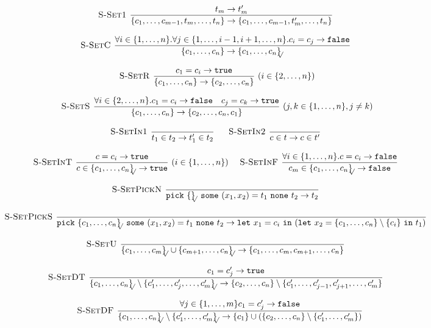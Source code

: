 \documentclass[a4paper]{article}
\newcommand{\s}[1]{\mathtt{#1}}
\newcommand{\sLb}{\s{\{}}
\newcommand{\sRb}{\s{\}}}
\newcommand{\spick}[3]{\s{pick}\ #1\ \s{some}\ #2\ \s{none}\ #3}
\newcommand{\sletin}[2]{\s{let\ } #1 \s{\ in\ } #2}
\newcommand{\strue}{\s{true}}
\newcommand{\sfalse}{\s{false}}
\newcommand{\sset}[1]{\sLb #1 \sRb}
\newcommand{\ssetc}[1]{\sset{#1}_{\!\!\!\surd}}
\newcommand{\step}{\to}
\newcommand{\dotset}[2]{\{#1,\ldots,#2\}}
\renewcommand{\rule}[3][]{\ \mbox{\textsc{#1 }}\dfrac{#2}{#3}\ }
\begin{document}
\[\begin{array}{c}
\rule[S-Set1]{t_m \step t'_m}{\{c_1,\ldots,c_{m-1},t_m,\ldots,t_n\} \step \{c_1,\ldots,c_{m-1},t'_m,\ldots,t_n\} }
\quad\\\\
\rule[S-SetC]{\forall i \in \dotset{1}{n}.\forall j \in \dotset{1}{i-1,i+1,\ldots,n}. c_i = c_j \step \sfalse}
{\sset{c_1,\ldots,c_n} \step \ssetc{c_1,\ldots,c_n}}
\quad\\\\
\rule[S-SetR]{c_1 = c_i \step \strue}
{\sset{c_1,\ldots,c_n} \step \sset{c_2,\ldots,c_n}}(i \in \dotset{2}{n})
\quad\\\\
\rule[S-SetS]{\forall i \in \dotset{2}{n}. c_1 = c_i \step \sfalse
\quad c_j = c_k \step \strue}
{\sset{c_1,\ldots,c_n} \step \sset{c_2,\ldots,c_n,c_1}}(j,k \in \dotset{1}{n}, j\neq k)
\quad\\\\
\rule[S-SetIn1]{}{t_1\in t_2 \step t_1'\in t_2}
\quad
\rule[S-SetIn2]{}{c\in t \step c\in t'}
\quad\\\\
\rule[S-SetInT]{c=c_i \step \strue}{c\in \ssetc{c_1,\ldots,c_n} \step \strue}(i \in \dotset{1}{n})
\quad
\rule[S-SetInF]{\forall i\in\{1,\ldots,n\}. c=c_i \step \sfalse}{c_m \in \ssetc{c_1,\ldots,c_n} \step \sfalse}
\quad\\\\
\rule[S-SetPickN]{}{\spick{\ssetc{}}{(x_1,x_2) = t_1}{t_2} \step t_2}
\quad\\\\
\rule[S-SetPickS]{}{\spick{\ssetc{c_1,\ldots,c_n}}{(x_1,x_2) = t_1}{t_2} \step \sletin{x_1 = c_i}{(\sletin{x_2 = \sset{c_1,\ldots,c_n}\setminus\sset{c_i}}{t_1}})}
\quad\\\\
\rule[S-SetU]{}{\ssetc{c_1,\ldots,c_m} \cup \ssetc{c_{m+1},\ldots,c_n} \step
\{c_1,\ldots,c_m,c_{m+1},\ldots,c_n\}}
\quad\\\\
\rule[S-SetDT]{c_1 = c'_j \step \strue}
{\ssetc{c_1,\ldots,c_n} \setminus \ssetc{c'_1,\ldots,c'_j,\ldots,c'_m} \step
  \sset{c_2,\ldots,c_n} \setminus \sset{c'_1,\ldots,c'_{j-1},c'_{j+1},\ldots,c'_m}
}
\quad\\\\
\rule[S-SetDF]{\forall j \in \dotset{1}{m} c_1 = c'_j \step \sfalse}
{\ssetc{c_1,\ldots,c_n} \setminus \ssetc{c'_1,\ldots,c'_m} \step
  \sset{c_1} \cup (\sset{c_2,\ldots,c_n} \setminus \sset{c'_1,\ldots,c'_m})
}
\end{array}\]
\end{document}
